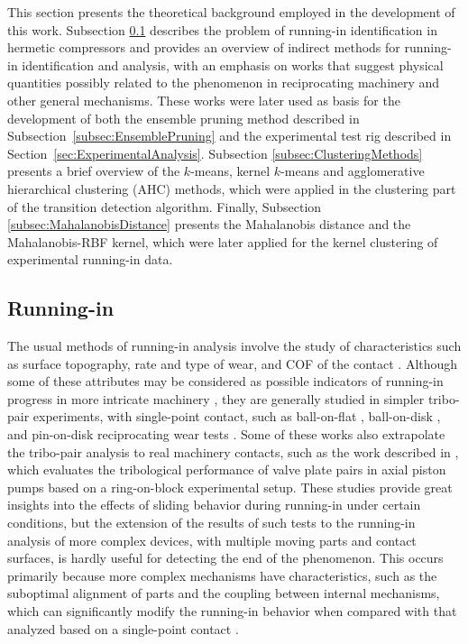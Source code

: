 \documentclass[preprint,11pt,number]{elsarticle}
\begin{document}

This section presents the theoretical background employed in the development of this work. Subsection \ref{subsec:RunningIn} describes the problem of running-in identification in hermetic compressors and provides an overview of indirect methods for running-in identification and analysis, with an emphasis on works that suggest physical quantities possibly related to the phenomenon in reciprocating machinery and other general mechanisms. These works were later used as basis for the development of both the ensemble pruning method described in Subsection~\ref{subsec:EnsemblePruning} and the experimental test rig described in Section~\ref{sec:ExperimentalAnalysis}. Subsection \ref{subsec:ClusteringMethods} presents a brief overview of the $k$-means, kernel $k$-means and agglomerative hierarchical clustering (AHC) methods, which were applied in the clustering part of the transition detection algorithm. Finally, Subsection \ref{subsec:MahalanobisDistance} presents the Mahalanobis distance and the Mahalanobis-RBF kernel, which were later applied for the kernel clustering of experimental running-in data.

\subsection{Running-in}\label{subsec:RunningIn}

The usual methods of running-in analysis involve the study of characteristics such as surface topography, rate and type of wear, and COF of the contact \cite{Khonsari2021,Blau1982}. Although some of these attributes may be considered as possible indicators of running-in progress in more intricate machinery \cite{Ruggiero2020}, they are generally studied in simpler tribo-pair experiments, with single-point contact, such as ball-on-flat \cite{Blau1981}, ball-on-disk \cite{Grutzmacher2018}, and pin-on-disk reciprocating wear tests \cite{Lin2024,Zambrano2024,Ghatrehsamani2022}. Some of these works also extrapolate the tribo-pair analysis to real machinery contacts, such as the work described in \cite{Jiao2023}, which evaluates the tribological performance of valve plate pairs in axial piston pumps based on a ring-on-block experimental setup. These studies provide great insights into the effects of sliding behavior during running-in under certain conditions, but the extension of the results of such tests to the running-in analysis of more complex devices, with multiple moving parts and contact surfaces, is hardly useful for detecting the end of the phenomenon. This occurs primarily because more complex mechanisms have characteristics, such as the suboptimal alignment of parts and the coupling between internal mechanisms, which can significantly modify the running-in behavior when compared with that analyzed based on a single-point contact \cite{Blau1991}.
\end{document}
